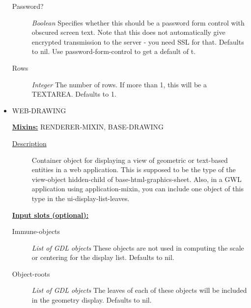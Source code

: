 \documentclass [11pt]{book}
\begin{document}
\begin{itemize}
\begin{description}
\item [Password?]
\emph{Boolean} Specifies whether this should be a password form control with obscured screen text.
Note that this does not automatically give encrypted transmission to the server - you need SSL
for that. Defaults to nil. Use password-form-control to get a default of t.


\item [Rows]
\emph{Integer} The number of rows. If more than 1, this will be a TEXTAREA. Defaults to 1.


\end{description}







\item {}WEB-DRAWING


\textbf{
\underline{Mixins:}} RENDERER-MIXIN, BASE-DRAWING





\begin{description}

\item [
\underline{Description}]


Container object for displaying a view of geometric 
or text-based entities in a web application. This is supposed to be the type of the
view-object hidden-child of base-html-graphics-sheet. Also, in a GWL application using 
application-mixin, you can include one object of this type in the ui-display-list-leaves.




\end{description}








\textbf{
\underline{Input slots (optional):}}

\begin{description}

\item [Immune-objects]
\emph{List of GDL objects} These objects are not used in computing the scale or centering for the display list. Defaults to nil.


\item [Object-roots]
\emph{List of GDL objects} The leaves of each of these objects will be included in the geometry display. Defaults to nil.



\end{description}
\end{itemize}
\end{document}
